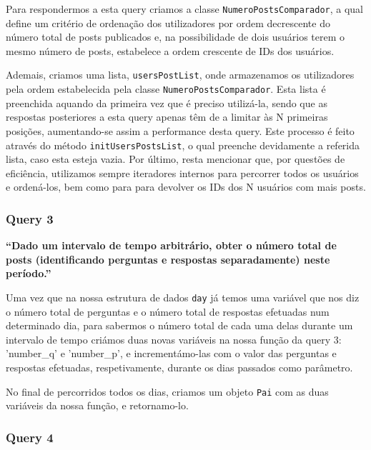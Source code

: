 \documentclass[a4paper]{article}
\begin{document}
\vspace{0.1cm}

Para respondermos a esta query criamos a classe \texttt{NumeroPostsComparador}, a
qual define um critério de ordenação dos utilizadores por ordem decrescente do
número total de posts publicados e, na possibilidade de dois usuários terem o mesmo número
de posts, estabelece a ordem crescente de IDs dos usuários.\par
Ademais, criamos uma lista, \texttt{usersPostList}, onde armazenamos os utilizadores
pela ordem estabelecida pela classe \texttt{NumeroPostsComparador}. Esta lista é
preenchida aquando da primeira vez que é preciso utilizá-la, sendo que as respostas
posteriores a esta query apenas têm de a limitar às N primeiras posições,
aumentando-se assim a performance desta query.
Este processo é feito através do método \texttt{initUsersPostsList}, o qual
preenche devidamente a referida lista, caso esta esteja vazia.
Por último, resta mencionar que, por questões de eficiência, utilizamos sempre
iteradores internos para percorrer todos os usuários e ordená-los, bem como para
para devolver os IDs dos N usuários com mais posts.



\subsubsection*{Query 3}
\label{sec:query3}

\textbf{“Dado um intervalo de tempo arbitrário,
obter o número total de posts (identificando perguntas e respostas separadamente) neste período.”}

\vspace{0.1cm}

Uma vez que na nossa estrutura de dados \texttt{day} já temos uma variável
que nos diz o número total de perguntas
e o número total de respostas efetuadas num determinado dia, para sabermos o
número total de cada uma delas durante um intervalo de tempo criámos duas novas
variáveis na nossa função da query 3: \textsf{'number\_q'} e \textsf{'number\_p'},
e incrementámo-las com o valor das perguntas e respostas efetuadas, respetivamente,
durante os dias passados como parâmetro.

No final de percorridos todos os dias, criamos um objeto \texttt{Pai} com as duas
variáveis da nossa função, e retornamo-lo.



\subsubsection*{Query 4}
\label{sec:query4}
\end{document}
